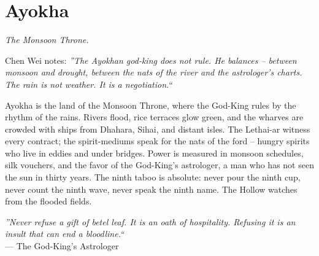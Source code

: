 \documentclass[12pt,oneside]{book}
\begin{document}
\chapter{Ayokha}
\emph{The Monsoon Throne.}

\noindent
Chen Wei notes: \textit{''The Ayokhan god-king does not rule. He balances -- between monsoon and drought, between the nats of the river and the astrologer's charts. The rain is not weather. It is a negotiation.``}

\noindent
Ayokha is the land of the Monsoon Throne, where the God-King rules by the rhythm of the rains. Rivers flood, rice terraces glow green, and the wharves are crowded with ships from Dhahara, Sihai, and distant isles. The Lethai-ar witness every contract; the spirit-mediums speak for the nats of the ford -- hungry spirits who live in eddies and under bridges. Power is measured in monsoon schedules, silk vouchers, and the favor of the God-King's astrologer, a man who has not seen the sun in thirty years. The ninth taboo is absolute: never pour the ninth cup, never count the ninth wave, never speak the ninth name. The Hollow watches from the flooded fields.

\vspace{0.5em}
\noindent\textit{''Never refuse a gift of betel leaf. It is an oath of hospitality. Refusing it is an insult that can end a bloodline.``} \\
--- The God-King's Astrologer
\end{document}
